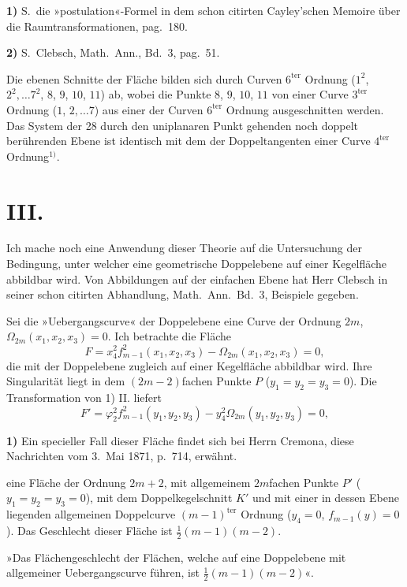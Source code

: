 \documentclass{article}
\begin{document}
\textbf{1)} S.\ die »postulation«-Formel in dem schon citirten Cayley'schen Memoire über die Raumtransformationen, pag.\ 180.

\textbf{2)} S.\ Clebsch, Math.\ Ann., Bd.\ 3, pag.\ 51.

Die ebenen Schnitte der Fläche bilden sich durch Curven $6^{\text{ter}}$ Ordnung ($1^2$, $2^2, \ldots 7^2$, $8$, $9$, $10$, $11$) ab, wobei die Punkte $8$, $9$, $10$, $11$ von einer Curve $3^{\text{ter}}$ Ordnung ($1$, $2, \ldots 7$) aus einer der Curven $6^{\text{ter}}$ Ordnung ausgeschnitten werden. Das System der 28 durch den uniplanaren Punkt gehenden noch doppelt berührenden Ebene ist identisch mit dem der Doppeltangenten einer Curve $4^{\text{ter}}$ Ordnung${}^{1)}$.

\section*{III.}

Ich mache noch eine Anwendung dieser Theorie auf die Untersuchung der Bedingung, unter welcher eine geometrische Doppelebene auf einer Kegelfläche abbildbar wird. Von Abbildungen auf der einfachen Ebene hat Herr Clebsch in seiner schon citirten Abhandlung, Math.\ Ann.\ Bd.\ 3, Beispiele gegeben.

Sei die »Uebergangscurve« der Doppelebene eine Curve der Ordnung $2m$, $\varOmega_{2m}(x_1, x_2, x_3) = 0$. Ich betrachte die Fläche
\[ F = x_4^2 f_{m-1}^2(x_1, x_2, x_3) - \varOmega_{2m}(x_1, x_2, x_3) = 0, \]
die mit der Doppelebene zugleich auf einer Kegelfläche abbildbar wird. Ihre Singularität liegt in dem $(2m-2)$fachen Punkte $P$ ($y_1 = y_2 = y_3 = 0$). Die Transformation von 1) II. liefert
\[ F' = \varphi_2^2 f_{m-1}^2(y_1, y_2, y_3) - y_4^2 \varOmega_{2m}(y_1, y_2, y_3) = 0, \]

\textbf{1)} Ein specieller Fall dieser Fläche findet sich bei Herrn Cremona, diese Nachrichten vom 3.\ Mai 1871, p.\ 714, erwähnt.

eine Fläche der Ordnung $2m+2$, mit allgemeinem $2m$fachen Punkte $P'$ ($y_1 = y_2 = y_3 = 0$), mit dem Doppelkegelschnitt $K'$ und mit einer in dessen Ebene liegenden allgemeinen Doppelcurve $(m-1)^{\text{ter}}$ Ordnung ($y_4 = 0$, $f_{m-1}(y) = 0$). Das Geschlecht dieser Fläche ist $\frac{1}{2}(m-1)(m-2)$.

»Das Flächengeschlecht der Flächen, welche auf eine Doppelebene mit allgemeiner Uebergangscurve führen, ist $\frac{1}{2}(m-1)(m-2)$«.
\end{document}
